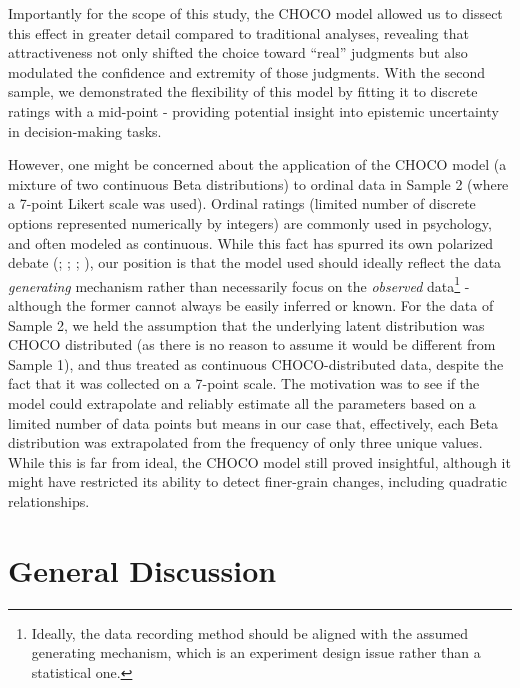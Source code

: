\documentclass[
  jou,
  floatsintext,
  longtable,
  nolmodern,
  notxfonts,
  notimes,
  colorlinks=true,linkcolor=blue,citecolor=blue,urlcolor=blue]{apa7}
\begin{document}
Importantly for the scope of this study, the CHOCO model allowed us to
dissect this effect in greater detail compared to traditional analyses,
revealing that attractiveness not only shifted the choice toward
``real'' judgments but also modulated the confidence and extremity of
those judgments. With the second sample, we demonstrated the flexibility
of this model by fitting it to discrete ratings with a mid-point -
providing potential insight into epistemic uncertainty in
decision-making tasks.

However, one might be concerned about the application of the CHOCO model
(a mixture of two continuous Beta distributions) to ordinal data in
Sample 2 (where a 7-point Likert scale was used). Ordinal ratings
(limited number of discrete options represented numerically by integers)
are commonly used in psychology, and often modeled as continuous. While
this fact has spurred its own polarized debate
(;
;
;
), our
position is that the model used should ideally reflect the data
\emph{generating} mechanism rather than necessarily focus on the
\emph{observed} data\footnote{Ideally, the data recording method should
  be aligned with the assumed generating mechanism, which is an
  experiment design issue rather than a statistical one.} - although the
former cannot always be easily inferred or known. For the data of Sample
2, we held the assumption that the underlying latent distribution was
CHOCO distributed (as there is no reason to assume it would be different
from Sample 1), and thus treated as continuous CHOCO-distributed data,
despite the fact that it was collected on a 7-point scale. The
motivation was to see if the model could extrapolate and reliably
estimate all the parameters based on a limited number of data points but
means in our case that, effectively, each Beta distribution was
extrapolated from the frequency of only three unique values. While this
is far from ideal, the CHOCO model still proved insightful, although it
might have restricted its ability to detect finer-grain changes,
including quadratic relationships.

\section{General Discussion}\label{general-discussion}
\end{document}
